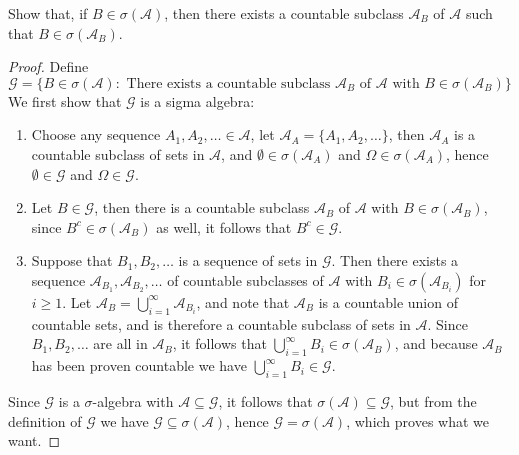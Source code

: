 \documentclass[12pt]{article}
\newcommand{\A}{\mathcal{A}}
\newcommand{\G}{\mathcal{G}}
\newcommand{\seq}{\subseteq}
\newcommand{\Om}{\Omega}
\newcommand{\es}{\emptyset}
\newenvironment{exercise}[2][Exercise]{\begin{trivlist}
\item[\hskip \labelsep {\bfseries #1}\hskip \labelsep {\bfseries #2.}]}{\end{trivlist}}
\begin{document}
\begin{exercise}{2.9}
    Show that, if $B \in \sigma (\A)$, then there exists a countable subclass $\A_{B}$ of $\A$ such that $B \in \sigma (\A_{B})$.
\end{exercise}
\begin{proof}
    Define
    \[ \G = \{ B \in \sigma (\A) : \text{ There exists a countable subclass } \A_{B} \text { of } \A \text { with } B \in \sigma (\A_B) \} \]
    We first show that $\G$ is a sigma algebra:
    \begin{enumerate}
        \item Choose any sequence $A_1, A_2, \ldots \in \A$, let $\A_{A} = \{ A_1, A_2, \ldots \}$, then $\A_{A}$ is a countable subclass of sets in $\A$, and $\es \in \sigma (\A_A)$ and $\Om \in \sigma (\A_A)$, hence $\es \in \G$ and $\Om \in \G$.
        \item Let $B \in \G$, then there is a countable subclass $\A_B$ of $\A$ with $B \in \sigma (\A_B)$, since $B^{c} \in \sigma (\A_B)$ as well, it follows that $B^{c} \in \G$.
        \item Suppose that $B_1, B_2, \ldots$ is a sequence of sets in $\G$. Then there exists a sequence $\A_{B_1}, \A_{B_2}, \ldots$ of countable subclasses of $\A$ with $B_i \in \sigma (\A_{B_i})$ for $i \geq 1$. Let $\A_{B} = \bigcup_{i=1}^{\infty} \A_{B_i}$, and note that $\A_B$ is a countable union of countable sets, and is therefore a countable subclass of sets in $\A$. Since $B_1, B_2, \ldots$ are all in $\A_B$, it follows that $\bigcup_{i=1}^{\infty} B_i \in \sigma (\A_B)$, and because $\A_B$ has been proven countable we have $\bigcup_{i=1}^{\infty} B_i \in \G$.
    \end{enumerate}
    Since $\G$ is a $\sigma$-algebra with $\A \seq \G$, it follows that $\sigma (\A) \seq \G$, but from the definition of $\G$ we have $\G \seq \sigma (\A)$, hence $\G = \sigma (\A)$, which proves what we want.
\end{proof}
\end{document}
